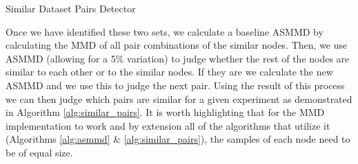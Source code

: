 \documentclass{mpaper}
\begin{document}
\begin{algorithm}
    \DontPrintSemicolon
    \caption{Similar Dataset Pairs Detector
    }\label{alg:similar_pairs}
    
    
\end{algorithm}

Once we have identified these two sets, we calculate a baseline ASMMD by calculating the MMD of all pair combinations of the similar nodes. Then, we use ASMMD (allowing for a 5\% variation) to judge whether the rest of the nodes are similar to each other or to the similar nodes. If they are we calculate the new ASMMD and we use this to judge the next pair. Using the result of this process we can then judge which pairs are similar for a given experiment as demonstrated in Algorithm  \ref{alg:similar_pairs}. It is worth highlighting that for the MMD implementation to work and by extension all of the algorithms that utilize it (Algorithms \ref{alg:asmmd} \& \ref{alg:similar_pairs}), the samples of each node need to be of equal size.
\end{document}
